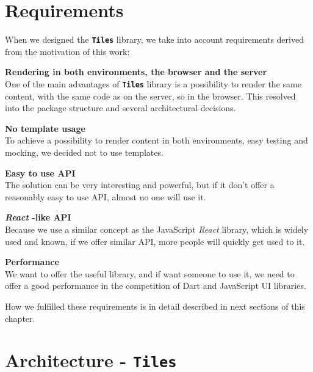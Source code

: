 \documentclass[oneside, 12pt]{book}
\newcommand{\tiles}[0]{\textbf{\texttt{Tiles}} }
\newcommand{\react}[0]{\textit{React} }
\begin{document}
\section{Requirements}\label{subsec:our-architecture-requirements}

  When we designed the \tiles library, we take into account requirements derived from the motivation of this work:

  \begin{description}
    \item{\textbf{Rendering in both environments, the browser and the server}} \hfill \\
      One of the main advantages of \tiles library is a possibility to render the same content, 
      with the same code as on the server, so in the browser.
      This resolved into the package structure and several architectural decisions.
      \begin{description}
        \item{\textbf{No template usage}} \hfill \\
          To achieve a possibility to render content in both environments, easy testing and mocking, 
          we decided not to use templates.
      \end{description}
    \item{\textbf{Easy to use API}} \hfill \\
      The solution can be very interesting and powerful, 
      but if it don't offer a reasonably easy to use API, almost no one will use it.
      \begin{description}
        \item{\textbf{\react-like API}} \hfill \\
          Because we use a similar concept as the JavaScript \react library,  
          which is widely used and known, 
          if we offer similar API, more people will quickly get used to it.
      \end{description}
    \item{\textbf{Performance}} \hfill \\
      We want to offer the useful library, and if want someone to use it, 
      we need to offer a good performance in the competition of Dart and JavaScript UI libraries.
  \end{description}

  How we fulfilled these requirements is in detail described in next sections of this chapter.

\section{Architecture - \tiles}\label{sec:our-architecture}
\end{document}
